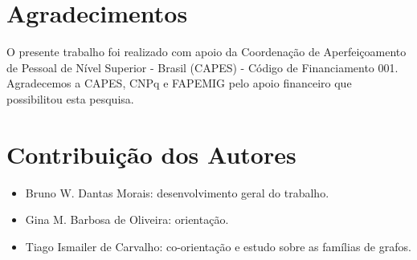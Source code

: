 \documentclass[fleqn,10pt]{SelfArx} %
\begin{document}



\section{Agradecimentos}

O presente trabalho foi realizado com apoio da Coordenação de Aperfeiçoamento de Pessoal de Nível Superior - Brasil (CAPES) - Código de Financiamento 001. Agradecemos a CAPES, CNPq e FAPEMIG pelo apoio financeiro que possibilitou esta pesquisa.

\section{Contribuição dos Autores}

\begin{itemize}
    \item Bruno W. Dantas Morais: desenvolvimento geral do trabalho.
    \item Gina M. Barbosa de Oliveira: orientação.
    \item Tiago Ismailer de Carvalho: co-orientação e estudo sobre as famílias de grafos.
\end{itemize} 




\makeatletter
\renewcommand\@biblabel[1]{{\parbox{0.7cm}{[#1]}}}
\makeatother
\renewcommand{\refname}{Referências}






\balance
\end{document}
